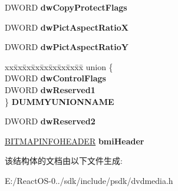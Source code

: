 \begin{DoxyCompactItemize}
D\+W\+O\+RD {\bfseries dw\+Copy\+Protect\+Flags}
\item 
\mbox{\label{structtag_v_i_d_e_o_i_n_f_o_h_e_a_d_e_r2_a728d94de37fd8f1978e50aa37c4d4110}} 
D\+W\+O\+RD {\bfseries dw\+Pict\+Aspect\+RatioX}
\item 
\mbox{\label{structtag_v_i_d_e_o_i_n_f_o_h_e_a_d_e_r2_a981a1e05e1855514bcb05310f8ba5219}} 
D\+W\+O\+RD {\bfseries dw\+Pict\+Aspect\+RatioY}
\item 
\mbox{\label{structtag_v_i_d_e_o_i_n_f_o_h_e_a_d_e_r2_aaa4822fd8004e38f03b8693e00a9389d}} 
\begin{tabbing}
xx\=xx\=xx\=xx\=xx\=xx\=xx\=xx\=xx\=\kill
union \{\\
\>DWORD {\bfseries dwControlFlags}\\
\>DWORD {\bfseries dwReserved1}\\
\} {\bfseries DUMMYUNIONNAME}\\

\end{tabbing}\item 
\mbox{\label{structtag_v_i_d_e_o_i_n_f_o_h_e_a_d_e_r2_a6f26a656475f990aea3570687820d3b2}} 
D\+W\+O\+RD {\bfseries dw\+Reserved2}
\item 
\mbox{\label{structtag_v_i_d_e_o_i_n_f_o_h_e_a_d_e_r2_ab3f8c6a5bfb1a3a992283ece5efe64d0}} 
\hyperlink{struct_b_i_t_m_a_p_i_n_f_o_h_e_a_d_e_r}{B\+I\+T\+M\+A\+P\+I\+N\+F\+O\+H\+E\+A\+D\+ER} {\bfseries bmi\+Header}
\end{DoxyCompactItemize}


该结构体的文档由以下文件生成\+:\begin{DoxyCompactItemize}
\item 
E\+:/\+React\+O\+S-\/0../sdk/include/psdk/dvdmedia.\+h\end{DoxyCompactItemize}
